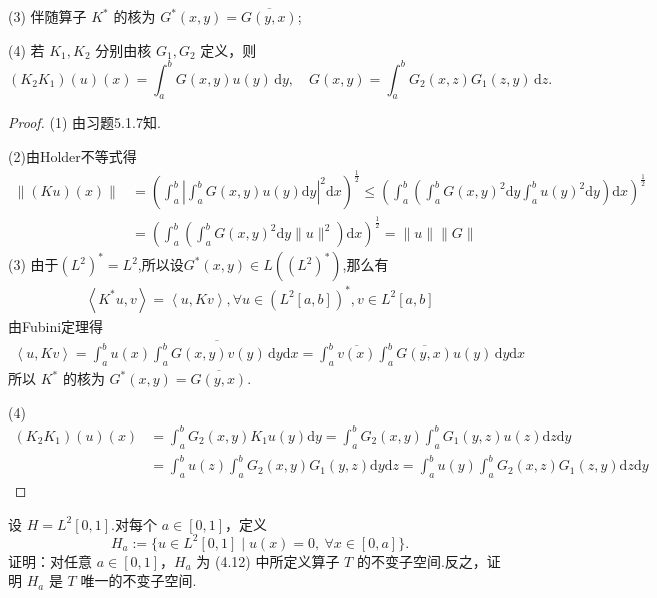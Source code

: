 \documentclass[lang=cn,newtx,10pt,scheme=chinese,thmcnt=chapter]{elegantbook}
\newcommand{\dif}{\mathrm{d}}
\begin{document}
\begin{problemset}
  (3) 伴随算子 \(K^{*}\) 的核为 \(G^{*}(x,y) = \overline{G(y,x)}\);  
  
  (4) 若 \(K_{1}, K_{2}\) 分别由核 \(G_{1}, G_{2}\) 定义，则
  \[
  (K_{2}K_{1})(u)(x) = \int_{a}^{b} G(x,y)u(y)\,\dif y,
  \quad G(x,y) = \int_{a}^{b} G_{2}(x,z)G_{1}(z,y)\,\dif z.
  \]
\begin{proof}
    (1) 由习题5.1.7知.

    (2)由Holder不等式得
\begin{equation*}
        \begin{aligned}
              \|(Ku)(x)\| &= \left(\int_a^b\left|\int_{a}^{b} G(x,y)u(y)\dif y\right|^2\dif x\right)^{\frac{1}{2}}\leqslant  \left(\int_a^b\left(\int_{a}^{b} G(x,y)^2\dif y\int _a^bu(y)^2\dif y\right)\dif x\right)^{\frac{1}{2}}\\
              &= \left(\int_a^b\left(\int_{a}^{b} G(x,y)^2\dif y\|u\|^2\right)\dif x\right)^{\frac{1}{2}}= \|u\|\|G\|
        \end{aligned}
    \end{equation*}
    (3) 由于$(L^2)^*=L^2$,所以设$G^*(x,y)\in L\left(\left(L^2\right)^*\right)$,那么有\begin{equation*}
        \begin{aligned}
            \left\langle K^*u,v\right\rangle=      \left\langle u ,Kv\right\rangle  ,\forall u \in (L^2[a,b])^*,v\in L^2[a,b]
        \end{aligned}
    \end{equation*}
   由Fubini定理得
\begin{equation*}
        \begin{aligned}
             \left\langle u ,Kv\right\rangle=\int_a^b u(x)\overline{\int_{a}^{b} G(x,y)v(y)\,\dif y}\dif x= \int_a^b \overline{v(x)}{\int_{a}^{b} \overline{G(y,x)}u(y)\,\dif y}\dif x
        \end{aligned}
    \end{equation*}
    所以 \(K^{*}\) 的核为 \(G^{*}(x,y) = \overline{G(y,x)}\).

    (4)\begin{equation*}
        \begin{aligned}
              (K_{2}K_{1})(u)(x)& = \int_a^b G_2(x,y)K_1u(y)\dif y= \int_a^b G_2(x,y)\int_a^b G_1(y,z)u(z)\dif z \dif y\\
              &= \int_a^bu(z) \int_a^b G_2(x,y)G_1(y,z)\dif y \dif z = \int_a^bu(y) \int_a^b G_2(x,z)G_1(z,y)\dif z \dif y
        \end{aligned}
    \end{equation*}
\end{proof}
  \item* 设 \(H = L^{2}[0,1]\).对每个 \(a \in [0,1]\)，定义
  \[
  H_{a} := \{u \in L^{2}[0,1] \mid u(x)=0,\ \forall x \in [0,a]\}.
  \]
  证明：对任意 \(a \in [0,1]\)，\(H_{a}\) 为 (4.12) 中所定义算子 \(T\) 的不变子空间.反之，证明 \(H_{a}\) 是 \(T\) 唯一的不变子空间.


\end{problemset}
\end{document}
